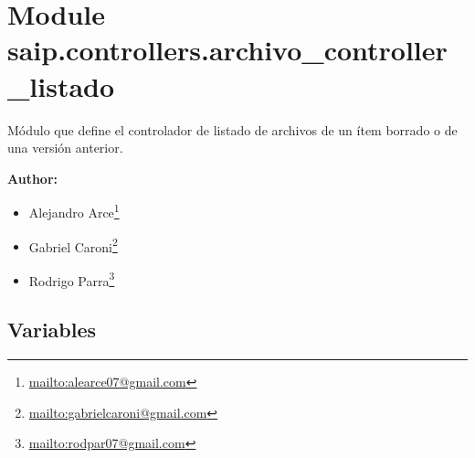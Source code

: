%
%
%


\section{Module saip.controllers.archivo\_controller\_listado}

    \label{saip:controllers:archivo_controller_listado}
Módulo que define el controlador de listado de archivos de un ítem borrado 
o de una versión anterior.

\textbf{Author:} \begin{itemize}
\setlength{\parskip}{0.6ex}
  \item Alejandro 
    Arce\footnote{\href{mailto:alearce07@gmail.com}{mailto:alearce07@gmail.com}}

  \item Gabriel 
    Caroni\footnote{\href{mailto:gabrielcaroni@gmail.com}{mailto:gabrielcaroni@gmail.com}}

  \item Rodrigo 
    Parra\footnote{\href{mailto:rodpar07@gmail.com}{mailto:rodpar07@gmail.com}}

\end{itemize}





  \subsection{Variables}

